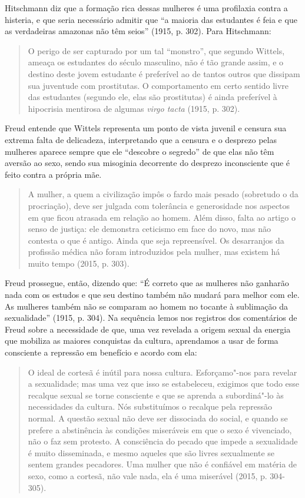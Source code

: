 Hitschmann diz que a formação rica dessas mulheres é uma profilaxia
contra a histeria, e que seria necessário admitir que ``a maioria das
estudantes é feia e que as verdadeiras amazonas não têm seios'' (1915,
p. 302). Para Hitschmann:

\begin{quote}
O perigo de ser capturado por um tal ``monstro'', que segundo Wittels,
ameaça os estudantes do século masculino, não é tão grande assim, e o
destino deste jovem estudante é preferível ao de tantos outros que
dissipam sua juventude com prostitutas. O comportamento em certo sentido
livre das estudantes (segundo ele, elas são prostitutas) é ainda
preferível à hipocrisia mentirosa de algumas \emph{virgo tacta} (1915, p. 302).
\end{quote}

Freud entende que Wittels representa um ponto de vista juvenil e censura
sua extrema falta de delicadeza, interpretando que a censura e o
desprezo pelas mulheres aparece sempre que ele ``descobre o segredo'' de
que elas não têm aversão ao sexo, sendo sua misoginia decorrente do
desprezo inconsciente que é feito contra a própria mãe.

\begin{quote}
A mulher, a quem a civilização impôs o fardo mais pesado (sobretudo o da
procriação), deve ser julgada com tolerância e generosidade nos aspectos
em que ficou atrasada em relação ao homem. Além disso, falta ao artigo o
senso de justiça: ele demonstra ceticismo em face do novo, mas não
contesta o que é antigo. Ainda que seja repreensível. Os desarranjos da
profissão médica não foram introduzidos pela mulher, mas existem há
muito tempo (2015, p. 303).
\end{quote}

Freud prossegue, então, dizendo que: ``É correto que as mulheres não
ganharão nada com os estudos e que seu destino também não mudará para
melhor com ele. As mulheres também não se comparam ao homem no tocante à
sublimação da sexualidade'' (1915, p. 304). Na sequência lemos nos
registros dos comentários de Freud sobre a necessidade de que, uma vez
revelada a origem sexual da energia que mobiliza as maiores conquistas
da cultura, aprendamos a usar de forma consciente a repressão em
benefício e acordo com ela:

\begin{quote}
O ideal de cortesã é inútil para nossa cultura. Esforçamo"-nos para
revelar a sexualidade; mas uma vez que isso se estabeleceu, exigimos que
todo esse recalque sexual se torne consciente e que se aprenda a
subordiná"-lo às necessidades da cultura. Nós substituímos o recalque
pela repressão normal. A questão sexual não deve ser dissociada do
social, e quando se prefere a abstinência às condições miseráveis em que
o sexo é vivenciado, não o faz sem protesto. A consciência do pecado que
impede a sexualidade é muito disseminada, e mesmo aqueles que são livres
sexualmente se sentem grandes pecadores. Uma mulher que não é confiável
em matéria de sexo, como a cortesã, não vale nada, ela é uma miserável
(2015, p. 304-305).
\end{quote}

